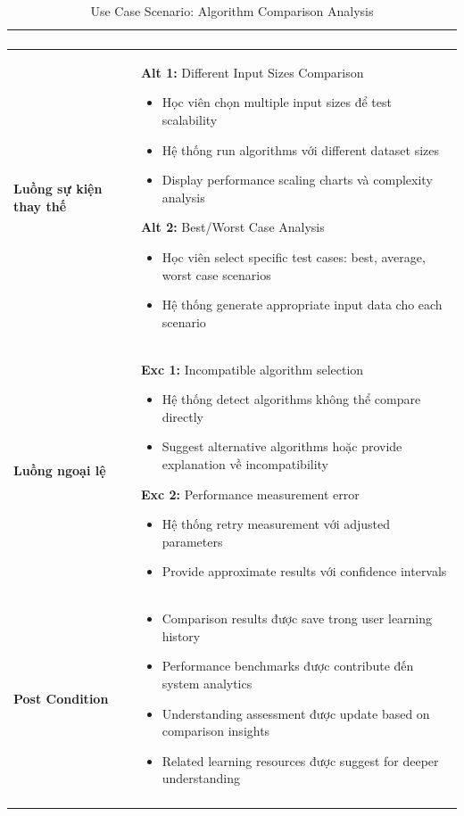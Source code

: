 \begin{longtable}{| p{3cm} | p{10cm} |}
\begin{enumerate}
\end{enumerate} \\ \hline
\textbf{Luồng sự kiện thay thế} & 
\textbf{Alt 1:} Different Input Sizes Comparison
\begin{itemize}
    \item Học viên chọn multiple input sizes để test scalability
    \item Hệ thống run algorithms với different dataset sizes
    \item Display performance scaling charts và complexity analysis
\end{itemize}
\textbf{Alt 2:} Best/Worst Case Analysis
\begin{itemize}
    \item Học viên select specific test cases: best, average, worst case scenarios
    \item Hệ thống generate appropriate input data cho each scenario
\end{itemize} \\ \hline
\textbf{Luồng ngoại lệ} & 
\textbf{Exc 1:} Incompatible algorithm selection
\begin{itemize}
    \item Hệ thống detect algorithms không thể compare directly
    \item Suggest alternative algorithms hoặc provide explanation về incompatibility
\end{itemize}
\textbf{Exc 2:} Performance measurement error
\begin{itemize}
    \item Hệ thống retry measurement với adjusted parameters
    \item Provide approximate results với confidence intervals
\end{itemize} \\ \hline
\textbf{Post Condition} & 
\begin{itemize}
    \item Comparison results được save trong user learning history
    \item Performance benchmarks được contribute đến system analytics
    \item Understanding assessment được update based on comparison insights
    \item Related learning resources được suggest for deeper understanding
\end{itemize} \\ \hline
\caption{Use Case Scenario: Algorithm Comparison Analysis}
\label{tab:uc004} \\
\end{longtable}

